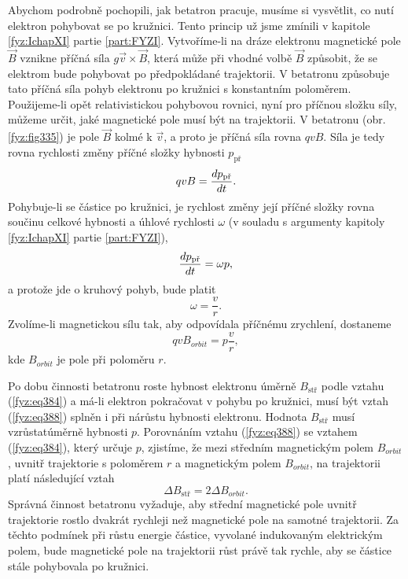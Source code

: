 {  Abychom podrobně pochopili, jak betatron pracuje, musíme si vysvětlit, co nutí elektron 
  pohybovat se po kružnici. Tento princip už jsme zmínili v kapitole \ref{fyz:IchapXI} partie 
  \ref{part:FYZI}. Vytvoříme-li na dráze elektronu magnetické pole \(\vec{B}\) vznikne příčná síla 
  \(g\vec{v}\times\vec{B}\), která může při vhodné volbě \(\vec{B}\) způsobit, že se elektrom bude 
  pohybovat po předpokládané trajektorii. V betatronu způsobuje tato příčná síla pohyb elektronu 
  po kružnici s konstantním poloměrem. Použijeme-li opět relativistickou pohybovou rovnici, nyní 
  pro příčnou složku síly, můžeme určit, jaké magnetické pole musí být na trajektorii. V betatronu 
  (obr. \ref{fyz:fig335}) je pole \(\vec{B}\) kolmé k \(\vec{v}\), a proto je příčná síla 
  rovna \(qvB\). Síla je tedy rovna rychlosti změny příčné složky hybnosti \(p_\text{př}\)
  \begin{equation}\label{fyz:eq385}
    qvB = \dfrac{d p_{\text{př}}}{d t}.
  \end{equation}
  Pohybuje-li se částice po kružnici, je rychlost změny její příčné složky rovna součinu celkové 
  hybnosti a úhlové rychlosti \(\omega\) (v souladu s argumenty kapitoly \ref{fyz:IchapXI} partie 
  \ref{part:FYZI}),
  \begin{equation}\label{fyz:eq386}
    \dfrac{d p_{\text{př}}}{d t} = \omega p, 
  \end{equation}
  a protože jde o kruhový pohyb, bude platit
  \begin{equation}\label{fyz:eq387}
    \omega = \frac{v}{r}. 
  \end{equation}
  Zvolíme-li magnetickou sílu tak, aby odpovídala příčnému zrychlení, dostaneme
  \begin{equation}\label{fyz:eq388}
    qvB_{orbit} = p\frac{v}{r},
  \end{equation}
  kde \(B_{orbit}\) je pole při poloměru \(r\). 
  
  Po dobu činnosti betatronu roste hybnost elektronu úměrně \(B_{\text{stř}}\) podle vztahu 
  (\ref{fyz:eq384}) a má-li elektron pokračovat v pohybu po kružnici, musí být vztah 
  (\ref{fyz:eq388}) splněn i při nárůstu hybnosti elektronu. Hodnota \(B_{\text{stř}}\) musí 
  vzrůstatúměrně hybnosti \(p\). Porovnáním vztahu (\ref{fyz:eq388}) se vztahem (\ref{fyz:eq384}), 
  který určuje \(p\), zjistíme, že mezi středním magnetickým polem \(B_{orbit}\), uvnitř 
  trajektorie s poloměrem \(r\) a magnetickým polem \(B_{orbit}\), na trajektorii platí následující 
  vztah
  \begin{equation}\label{fyz:eq389}
    \Delta B_{\text{stř}} = 2\Delta B_{orbit}.
  \end{equation}
  Správná činnost betatronu vyžaduje, aby střední magnetické pole uvnitř trajektorie rostlo dvakrát 
  rychleji než magnetické pole na samotné trajektorii. Za těchto podmínek při růstu energie 
  částice, vyvolané indukovaným elektrickým polem, bude magnetické pole na trajektorii růst právě 
  tak rychle, aby se částice stále pohybovala po kružnici. 
  
}

